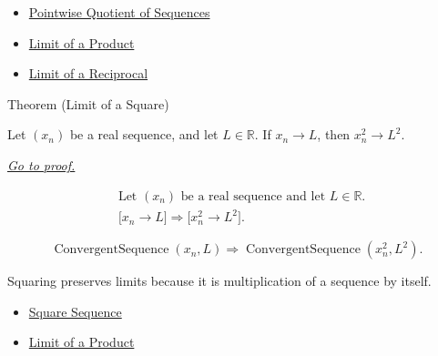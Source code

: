 \begin{dependencies}
\begin{itemize}
  \item \hyperref[def:pointwise-quotient-sequence]{Pointwise Quotient of Sequences}
  \item \hyperref[thm:limit-of-a-product]{Limit of a Product}
  \item \hyperref[thm:limit-of-a-reciprocal]{Limit of a Reciprocal}
\end{itemize}
\end{dependencies}


\begin{theorembox}{Theorem (Limit of a Square)}
\begin{theorem}
\label{thm:limit-of-a-square}
Let $(x_n)$ be a real sequence, and let $L\in\mathbb{R}$. If $x_n\to L$,
then $x_n^2\to L^2$.

\smallskip
\noindent
\hyperref[prf:limit-of-a-square]{\textit{Go to proof.}}
\end{theorem}
\end{theorembox}

\begin{remark*}
\[
\begin{aligned}
&\text{Let } (x_n) \text{ be a real sequence and let } L\in\mathbb{R}.\\
&\bigl[x_n\to L\bigr]
\Longrightarrow
\bigl[x_n^2\to L^2\bigr].
\end{aligned}
\]
\end{remark*}

\begin{remark*}
\[
\operatorname{ConvergentSequence}(x_n,L)
\Longrightarrow
\operatorname{ConvergentSequence}(x_n^2,L^2).
\]
\end{remark*}

\begin{remark*}[Interpretation]
Squaring preserves limits because it is multiplication of a sequence by
itself.
\end{remark*}

\begin{dependencies}
\begin{itemize}
  \item \hyperref[def:square-sequence]{Square Sequence}
  \item \hyperref[thm:limit-of-a-product]{Limit of a Product}
\end{itemize}
\end{dependencies}

